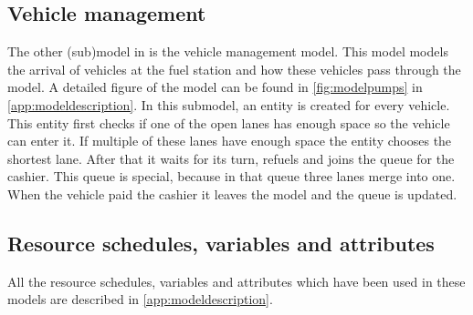 \subsection{Vehicle management}
The other (sub)model in is the vehicle management model. 
This model models the arrival of vehicles at the fuel station and how these vehicles pass through the model. 
A detailed figure of the model can be found in \autoref{fig:modelpumps} in \autoref{app:modeldescription}. 
In this submodel, an entity is created for every vehicle.
This entity first checks if one of the open lanes has enough space so the vehicle can enter it. 
If multiple of these lanes have enough space the entity chooses the shortest lane. 
After that it waits for its turn, refuels and joins the queue for the cashier. 
This queue is special, because in that queue three lanes merge into one. When the vehicle paid the cashier it leaves the model and the queue is updated. 

\subsection{Resource schedules, variables and attributes}
All the resource schedules, variables and attributes which have been used in these models are described in \autoref{app:modeldescription}.